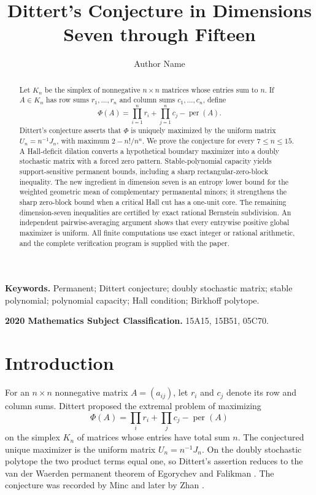 \documentclass[11pt]{article}
\title{Dittert's Conjecture in Dimensions Seven through Fifteen}
\author{Author Name}
\date{}
\theoremstyle{definition}
\newcommand{\per}{\operatorname{per}}
\newcommand{\1}{\mathbf{1}}
\begin{document}
\maketitle

\begin{abstract}
Let $K_n$ be the simplex of nonnegative $n\times n$ matrices whose entries
sum to $n$.  If $A\in K_n$ has row sums $r_1,\dots,r_n$ and column sums
$c_1,\dots,c_n$, define
\[
 \Phi(A)=\prod_{i=1}^n r_i+\prod_{j=1}^n c_j-\per(A).
\]
Dittert's conjecture asserts that $\Phi$ is uniquely maximized by the
uniform matrix $U_n=n^{-1}J_n$, with maximum $2-n!/n^n$.  We prove the
conjecture for every $7\le n\le15$.  A Hall-deficit dilation converts a
hypothetical boundary maximizer into a doubly stochastic matrix with a forced
zero pattern.  Stable-polynomial capacity yields support-sensitive permanent
bounds, including a sharp rectangular-zero-block inequality.  The new
ingredient in dimension seven is an entropy lower bound for the weighted
geometric mean of complementary permanental minors; it strengthens the sharp
zero-block bound when a critical Hall cut has a one-unit core.  The remaining
dimension-seven inequalities are certified by exact rational Bernstein
subdivision.  An independent pairwise-averaging argument shows that every
entrywise positive global maximizer is uniform.  All finite computations use
exact integer or rational arithmetic, and the complete verification program
is supplied with the paper.
\end{abstract}

\noindent\textbf{Keywords.}
Permanent; Dittert conjecture; doubly stochastic matrix; stable polynomial; polynomial capacity; Hall condition; Birkhoff polytope.

\medskip
\noindent\textbf{2020 Mathematics Subject Classification.}
15A15, 15B51, 05C70.

\section{Introduction}

For an $n\times n$ nonnegative matrix $A=(a_{ij})$, let $r_i$ and $c_j$
denote its row and column sums.  Dittert proposed the extremal problem of
maximizing
\[
 \Phi(A)=\prod_i r_i+\prod_j c_j-\per(A)
\]
on the simplex $K_n$ of matrices whose entries have total sum $n$.  The
conjectured unique maximizer is the uniform matrix $U_n=n^{-1}J_n$.  On the
doubly stochastic polytope the two product terms equal one, so Dittert's
assertion reduces to the van der Waerden permanent theorem of Egorychev and
Falikman \cite{Egorychev1981,Falikman1981}.  The conjecture was recorded by
Minc \cite{Minc1983} and later by Zhan \cite{Zhan2007}.
\end{document}
